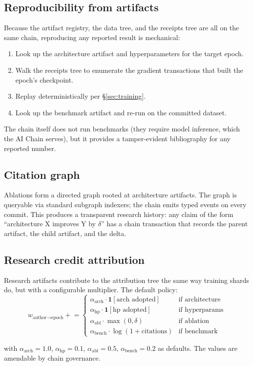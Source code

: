 \subsection{Reproducibility from artifacts}

Because the artifact registry, the data tree, and the receipts tree are all on the same chain, reproducing any reported result is mechanical:
\begin{enumerate}[nosep]
\item Look up the architecture artifact and hyperparameters for the target epoch.
\item Walk the receipts tree to enumerate the gradient transactions that built the epoch's checkpoint.
\item Replay deterministically per \S\ref{sec:training}.
\item Look up the benchmark artifact and re-run on the committed dataset.
\end{enumerate}

The chain itself does not run benchmarks (they require model inference, which the \Hanzo{} AI Chain serves), but it provides a tamper-evident bibliography for any reported number.

\subsection{Citation graph}

Ablations form a directed graph rooted at architecture artifacts. The graph is queryable via standard subgraph indexers; the chain emits typed events on every commit. This produces a transparent research history: any claim of the form ``architecture X improves Y by $\delta$'' has a chain transaction that records the parent artifact, the child artifact, and the delta.

\subsection{Research credit attribution}

Research artifacts contribute to the attribution tree the same way training shards do, but with a configurable multiplier. The default policy:
\begin{equation}
w_{\text{author} \to \text{epoch}} \mathrel{+}=
\begin{cases}
\alpha_{\text{arch}} \cdot \mathbf{1}[\text{arch adopted}] & \text{if architecture} \\
\alpha_{\text{hp}} \cdot \mathbf{1}[\text{hp adopted}] & \text{if hyperparams} \\
\alpha_{\text{abl}} \cdot \max(0, \delta) & \text{if ablation} \\
\alpha_{\text{bench}} \cdot \log(1 + \text{citations}) & \text{if benchmark}
\end{cases}
\end{equation}

with $\alpha_{\text{arch}} = 1.0$, $\alpha_{\text{hp}} = 0.1$, $\alpha_{\text{abl}} = 0.5$, $\alpha_{\text{bench}} = 0.2$ as defaults. The values are amendable by chain governance.
